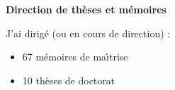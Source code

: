 \vspace{.3cm}

\centerline{\bf Direction de th\`eses et m\'emoires}

\vspace{.3cm}

J'ai dirig\'e (ou en cours de direction) :  
\begin{itemize}

\item 67 m\'emoires de ma\^{\i}trise 
\item 10 th\`eses de doctorat
\end{itemize}



%

%

%

%

%

%



